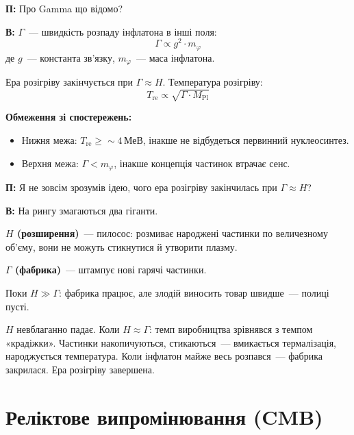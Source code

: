 \documentclass[12pt, a4paper]{article}
\newcommand{\Q}[1]{%
    \begin{questionbox}
        {\color{qcolor}\bfseries\sffamily П:} #1
    \end{questionbox}
}
\newcommand{\A}[1]{%
    \begin{answerbox}
        {\bfseries\sffamily В:} #1
    \end{answerbox}
}
\begin{document}

\Q{Про Gamma що відомо?}

\A{$\Gamma$~--- швидкість розпаду інфлатона в інші поля:
\begin{equation}
    \Gamma \propto g^2 \cdot m_\varphi
\end{equation}
де $g$~--- константа зв'язку, $m_\varphi$~--- маса інфлатона.

Ера розігріву закінчується при $\Gamma \approx H$. Температура розігріву:
\begin{equation}
    T_\text{re} \propto \sqrt{\Gamma \cdot M_\text{Pl}}
\end{equation}

\textbf{Обмеження зі спостережень:}
\begin{itemize}[noitemsep]
    \item Нижня межа: $T_\text{re} \geq \sim4$\,МеВ, інакше не відбудеться первинний нуклеосинтез.
    \item Верхня межа: $\Gamma < m_\varphi$, інакше концепція частинок втрачає сенс.
\end{itemize}}


\Q{Я не зовсім зрозумів ідею, чого ера розігріву закінчилась при $\Gamma \approx H$?}

\A{На рингу змагаються два гіганти.

\textbf{$H$ (розширення)}~--- пилосос: розмиває народжені частинки по величезному об'єму, вони не можуть стикнутися й утворити плазму.

\textbf{$\Gamma$ (фабрика)}~--- штампує нові гарячі частинки.

Поки $H \gg \Gamma$: фабрика працює, але злодій виносить товар швидше~--- полиці пусті.

$H$ невблаганно падає. Коли $H \approx \Gamma$: темп виробництва зрівнявся з темпом «крадіжки». Частинки накопичуються, стикаються~--- вмикається термалізація, народжується температура. Коли інфлатон майже весь розпався~--- фабрика закрилася. Ера розігріву завершена.}

\section{Реліктове випромінювання (CMB)}
\end{document}
